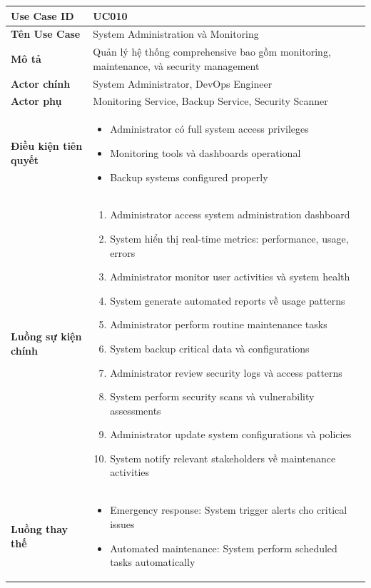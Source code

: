 \begin{longtable}{|p{4cm}|p{10cm}|}
\hline
\textbf{Use Case ID} & UC010 \\ \hline
\textbf{Tên Use Case} & System Administration và Monitoring \\ \hline
\textbf{Mô tả} & Quản lý hệ thống comprehensive bao gồm monitoring, maintenance, và security management \\ \hline
\textbf{Actor chính} & System Administrator, DevOps Engineer \\ \hline
\textbf{Actor phụ} & Monitoring Service, Backup Service, Security Scanner \\ \hline
\textbf{Điều kiện tiên quyết} & 
\begin{itemize}
    \item Administrator có full system access privileges
    \item Monitoring tools và dashboards operational
    \item Backup systems configured properly
\end{itemize} \\ \hline
\textbf{Luồng sự kiện chính} & 
\begin{enumerate}
    \item Administrator access system administration dashboard
    \item System hiển thị real-time metrics: performance, usage, errors
    \item Administrator monitor user activities và system health
    \item System generate automated reports về usage patterns
    \item Administrator perform routine maintenance tasks
    \item System backup critical data và configurations
    \item Administrator review security logs và access patterns
    \item System perform security scans và vulnerability assessments
    \item Administrator update system configurations và policies
    \item System notify relevant stakeholders về maintenance activities
\end{enumerate} \\ \hline
\textbf{Luồng thay thế} & 
\begin{itemize}
    \item Emergency response: System trigger alerts cho critical issues
    \item Automated maintenance: System perform scheduled tasks automatically

\end{itemize}
\end{longtable}
